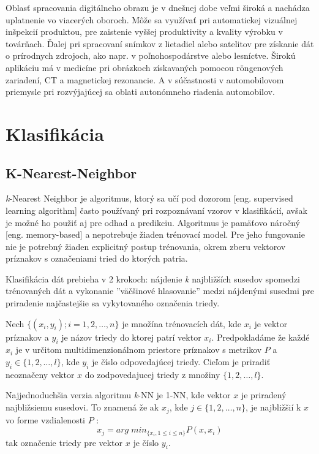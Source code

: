 Oblasť spracovania digitálneho obrazu je v dnešnej dobe veľmi široká a nachádza uplatnenie vo viacerých oboroch.
Môže sa využívať pri automatickej vizuálnej inšpekcií produktou, pre zaistenie vyššej produktivity a kvality výrobku v továrňach.
Ďalej pri spracovaní snímkov z lietadiel alebo satelitov pre získanie dát o prírodnych zdrojoch, ako napr. v poľnohospodárstve alebo lesníctve.
Širokú aplikáciu má v medicíne pri obrázkoch získavaných pomocou röngenových zariadení, CT a magnetickej rezonancie\cite{book:ImageProcessingApplication}.
A v súčastnosti v automobilovom priemysle pri rozvýjajúcej sa oblati autonómneho riadenia automobilov.


\section{Klasifikácia}
\label{sec:klasifikacia}

\subsection{K-Nearest-Neighbor}
\textit{k}-Nearest Neighbor je algoritmus, ktorý sa učí pod dozorom [eng. supervised learning algorithm] často používaný pri rozpoznávaní vzorov v klasifikácií,
avšak je možné ho použiť aj pre odhad a predikciu\cite{book:DataMining}.
Algoritmus je pamäťovo náročný [eng. memory-based] a nepotrebuje žiaden trénovací model.
Pre jeho fungovanie nie je potrebný žiaden explicitný postup trénovania, okrem zberu vektorov príznakov s označeniami tried do ktorých patria.

Klasifikácia dát prebieha v 2 krokoch: nájdenie \textit{k} najbližších susedov spomedzi trénovaných dát a
vykonanie ''väčšinové hlasovanie'' medzi nájdenými susedmi pre priradenie najčastejšie sa vykytovaného označenia triedy.

Nech $\{ (x_i, y_i); i = 1, 2, \dots, n \}$ je množína trénovacích dát, kde $x_i$ je vektor príznakov a $y_i$ je názov triedy do ktorej patrí vektor $x_i$.
Predpokladáme že každé $x_i$ je v určitom multidimenzionálnom priestore príznakov s metrikov $P$ a $y_i \in \{ 1, 2, \dots, l \}$, kde $y_i$ je číslo odpovedajúcej triedy.
Cieľom je priradiť neoznačeny vektor $x$ do zodpovedajucej triedy z množiny $\{ 1, 2, \dots, l \}$.

Najjednoduchšia verzia algoritmu \textit{k}-NN je 1-NN, kde vektor $x$ je priradený najbližsiemu susedovi.
To znamená že ak $x_j$, kde $j \in \{ 1, 2, \dots, n \}$, je najbližšií k $x$ vo forme vzdialenosti $P$ \cite{prop:KnnClassification}:
\begin{equation}
    \label{eq:kNNMetric}
    x_j = arg \; min_{\{x_i, 1 \leq i \leq n\}} P(x, x_i)
\end{equation}
tak označenie triedy pre vektor $x$ je číslo $y_i$.

